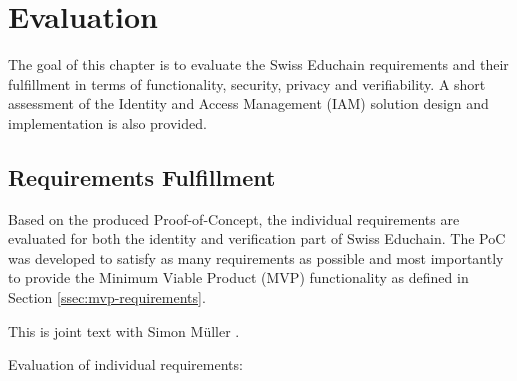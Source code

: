 \chapter{Evaluation}

The goal of this chapter is to evaluate the Swiss Educhain requirements and their fulfillment in terms of functionality, security, privacy and verifiability. A short assessment of the Identity and Access Management (IAM) solution design and implementation is also provided.

\section{Requirements Fulfillment} \label{sec:requirements-fulfillment}

Based on the produced Proof-of-Concept, the individual requirements are evaluated for both the identity and verification part of Swiss Educhain. The PoC was developed to satisfy as many requirements as possible and most importantly to provide the Minimum Viable Product (MVP) functionality as defined in Section \ref{ssec:mvp-requirements}.

This is joint text with Simon M{\"u}ller \cite{mueller20}.

Evaluation of individual requirements:

